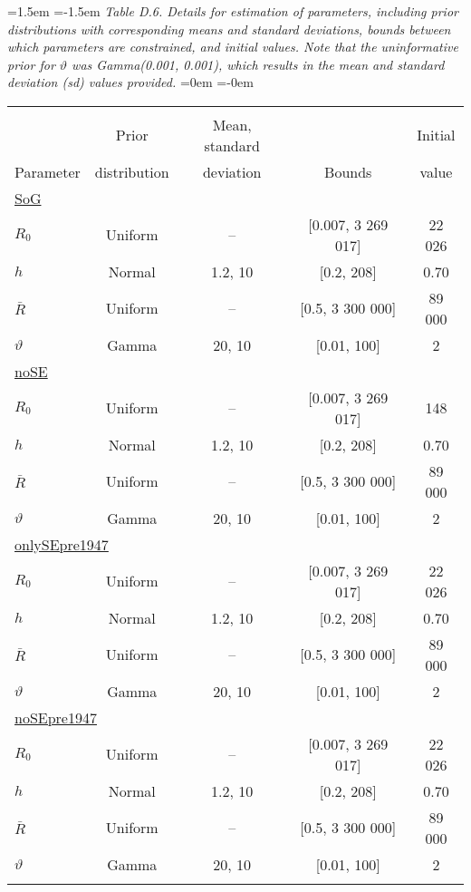 \documentclass[11pt]{article}   %
\def\AppLet{D}                   %
\def\vsd{\vspace*{1ex}}     %
\begin{document}
\begin{table}[tp]
\leftskip=1.5em
\parindent=-1.5em
{\it Table \AppLet.6. Details for estimation of parameters, including prior distributions with corresponding means and standard deviations, bounds between which parameters are constrained, and initial values.  Note that the uninformative prior for $\vartheta$ was Gamma(0.001, 0.001), which results in the mean and standard deviation (sd) values provided.}
\leftskip=0em
\parindent=-0em
\begin{center}
\begin{tabular}{lcccc} 
\hline \\[-1.5ex]
		&  Prior            & Mean, standard   &              & Initial\\ 
 Parameter    &  distribution  &  deviation            & Bounds & value\\ 
\hline %
\multicolumn{5}{l}{\underline{SoG}}\\
$R_0$ & Uniform & -- & [0.007, 3 269 017] & 22 026\\
$h$ & Normal & 1.2, 10 & [0.2, 208] & 0.70\\
$\bar{R}$ & Uniform & -- & [0.5, 3 300 000] & 89 000 \\
$\vartheta$ & Gamma & 20, 10 & [0.01, 100] & 2 \\
\multicolumn{5}{l}{\underline{noSE}}\\
$R_0$ & Uniform & -- & [0.007, 3 269 017] & 148\\
$h$ & Normal & 1.2, 10 & [0.2, 208] & 0.70\\
$\bar{R}$ & Uniform & -- & [0.5, 3 300 000] & 89 000 \\
$\vartheta$ & Gamma & 20, 10 & [0.01, 100] & 2 \\
\multicolumn{5}{l}{\underline{onlySEpre1947}}\\
$R_0$ & Uniform & -- & [0.007, 3 269 017] & 22 026\\
$h$ & Normal & 1.2, 10 & [0.2, 208] & 0.70\\
$\bar{R}$ & Uniform & -- & [0.5, 3 300 000] & 89 000 \\
$\vartheta$ & Gamma & 20, 10 & [0.01, 100] & 2 \\
\multicolumn{5}{l}{\underline{noSEpre1947}}\\
$R_0$ & Uniform & -- & [0.007, 3 269 017] & 22 026\\
$h$ & Normal & 1.2, 10 & [0.2, 208] & 0.70\\
$\bar{R}$ & Uniform & -- & [0.5, 3 300 000] & 89 000 \\
$\vartheta$ & Gamma & 20, 10 & [0.01, 100] & 2 \\
\hline 
\vsd\vspace{50ex}
\end{tabular} 

\end{center}
\end{table}
%
%
%
%
\end{document}
